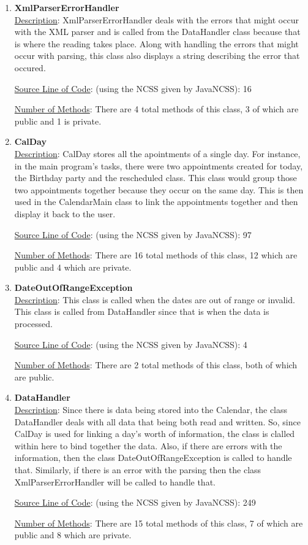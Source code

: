 \documentclass[12pt]{article}
\begin{document}
\begin{enumerate}
\item \textbf {XmlParserErrorHandler} \\
\underline{Description}: XmlParserErrorHandler deals with the errors that might occur with the XML parser and is called from the DataHandler class because that is where the reading takes place. Along with handling the errors that might occur with parsing, this class also displays a string describing the error that occured. 

\underline{Source Line of Code}: (using the NCSS given by JavaNCSS): 16 

\underline{Number of Methods}: There are 4 total methods of this class, 3 of which are public and 1 is private.

\item \textbf {CalDay} \\
\underline{Description}: CalDay stores all the apointments of a single day. For instance, in the main program's tasks, there were two appointments created for today, the Birthday party and the rescheduled class. This class would group those two appointments together because they occur on the same day. This is then used in the CalendarMain class to link the appointments together and then display it back to the user. 

\underline{Source Line of Code}: (using the NCSS given by JavaNCSS): 97 

\underline{Number of Methods}: There are 16 total methods of this class, 12 which are public and 4 which are private. 

\item \textbf {DateOutOfRangeException} \\
\underline{Description}: This class is called when the dates are out of range or invalid. This class is called from DataHandler since that is when the data is processed. 

\underline{Source Line of Code}: (using the NCSS given by JavaNCSS): 4 

\underline{Number of Methods}: There are 2 total methods of this class, both of which are public. 

\item \textbf {DataHandler} \\
\underline{Description}: Since there is data being stored into the Calendar, the class DataHandler deals with all data that being both read and written. So, since CalDay is used for linking a day's worth of information, the class is clalled within here to bind together the data. Also, if there are errors with the information, then the class DateOutOfRangeException is called to handle that. Similarly, if there is an error with the parsing then the class XmlParserErrorHandler will be called to handle that. 

\underline{Source Line of Code}: (using the NCSS given by JavaNCSS): 249 

\underline{Number of Methods}: There are 15 total methods of this class, 7 of which are public and 8 which are private. 

\end{enumerate}
\end{document}
